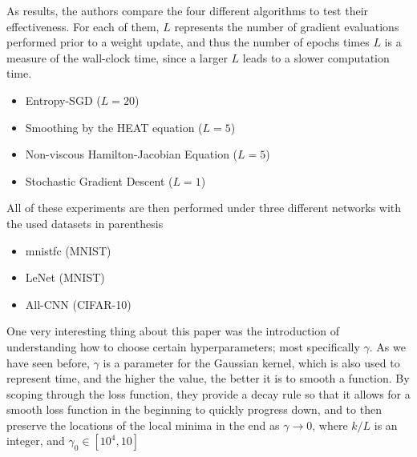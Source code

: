As results, the authors compare the four different algorithms to test their effectiveness. For each of them, $L$ represents the number of gradient evaluations performed prior to a weight update, and thus the number of epochs times $L$ is a measure of the wall-clock time, since a larger $L$ leads to a slower computation time.
\begin{itemize}
    \item Entropy-SGD ($L=20$)
    \item Smoothing by the HEAT equation ($L=5$)
    \item Non-viscous Hamilton-Jacobian Equation ($L=5$)
    \item Stochastic Gradient Descent ($L=1$)
\end{itemize}

All of these experiments are then performed under three different networks with the used datasets in parenthesis
\begin{itemize}
    \item mnistfc (MNIST)
    \item LeNet (MNIST)
    \item All-CNN (CIFAR-10)
\end{itemize}

One very interesting thing about this paper was the introduction of understanding how to choose certain hyperparameters; most specifically $\gamma$. As we have seen before, $\gamma$ is a parameter for the Gaussian kernel, which is also used to represent time, and the higher the value, the better it is to smooth a function. By scoping through the loss function, they provide a decay rule so that it allows for a smooth loss function in the beginning to quickly progress down, and to then preserve the locations of the local minima in the end as $\gamma \rightarrow 0$, where $k/L$ is an integer, and $\gamma_0 \in [10^4, 10]$

